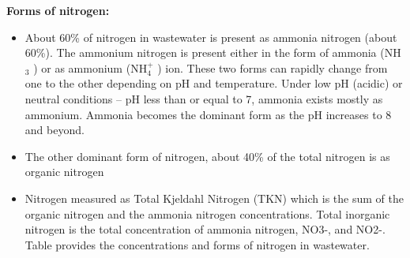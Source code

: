 \documentclass{article}
\begin{document}
	\textbf{Forms of nitrogen:}\\	
					      \begin{itemize}
					      	\item About 60\% of nitrogen in wastewater is present as ammonia nitrogen (about 60\%).  The ammonium nitrogen is present either in the form of ammonia (NH$_3$ ) or as ammonium (NH$_4^+$ ) ion.   These two forms can rapidly change from one to the other depending on pH and temperature.  Under low pH (acidic) or neutral conditions – pH less than or equal to 7, ammonia exists mostly as ammonium.  Ammonia becomes the dominant form as the pH increases to 8 and beyond.
					      	\item The other dominant form of nitrogen, about 40\% of the total nitrogen is as organic nitrogen
					      	\item Nitrogen measured as Total Kjeldahl Nitrogen (TKN) which is the sum of the organic nitrogen and the ammonia nitrogen concentrations.  Total inorganic nitrogen is the total concentration of ammonia nitrogen, NO3-, and NO2-.   Table provides the concentrations and forms of nitrogen in wastewater.
					      \end{itemize}
					      \setlength{\arrayrulewidth}{0.7mm}
					      \setlength{\tabcolsep}{8 pt}
					      \renewcommand{\arraystretch}{0.8}
\end{document}
